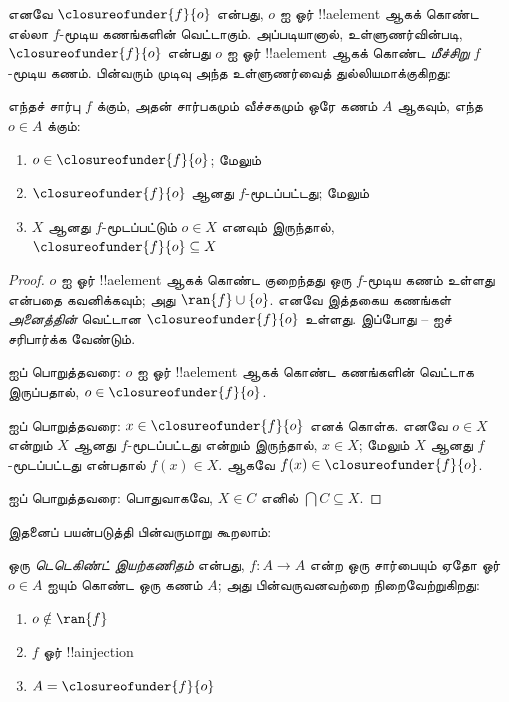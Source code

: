 \documentclass[../../../include/open-logic-section]{subfiles}
\begin{document}
எனவே $\closureofunder{f}{o}$ என்பது, $o$ ஐ ஓர் !!a{element} ஆகக்
கொண்ட எல்லா $f$-மூடிய கணங்களின் வெட்டாகும்.
அப்படியானால், உள்ளுணர்வின்படி, $\closureofunder{f}{o}$ என்பது
$o$ ஐ ஓர் !!a{element} ஆகக் கொண்ட \emph{மீச்சிறு} $f$-மூடிய கணம்.
பின்வரும் முடிவு அந்த உள்ளுணர்வைத் துல்லியமாக்குகிறது:
\begin{lem}
	எந்தச் சார்பு $f$ க்கும், அதன் சார்பகமும் வீச்சகமும் ஒரே கணம்
    $A$ ஆகவும், எந்த $o \in A$ க்கும்:
	\begin{enumerate}
		\item{} $o \in \closureofunder{f}{o}$; மேலும்
		\item{} $\closureofunder{f}{o}$ ஆனது $f$-மூடப்பட்டது; மேலும்
		\item{} $X$ ஆனது $f$-மூடப்பட்டும் $o \in
		X$ எனவும் இருந்தால், $\closureofunder{f}{o} \subseteq X$
	\end{enumerate}
\end{lem}

\begin{proof}
$o$ ஐ ஓர் !!a{element} ஆகக் கொண்ட குறைந்தது ஒரு $f$-மூடிய கணம்
உள்ளது என்பதை கவனிக்கவும்; அது $\ran{f}\cup \{o\}$.
எனவே இத்தகைய கணங்கள் \emph{அனைத்தின்} வெட்டான
$\closureofunder{f}{o}$ உள்ளது.
இப்போது -- ஐச்
சரிபார்க்க வேண்டும்.

 ஐப் பொறுத்தவரை:
$o$ ஐ ஓர் !!a{element} ஆகக் கொண்ட கணங்களின் வெட்டாக இருப்பதால்,
$o \in \closureofunder{f}{o}$.

 ஐப் பொறுத்தவரை:
$x \in \closureofunder{f}{o}$ எனக் கொள்க.
எனவே $o \in X$ என்றும் $X$ ஆனது $f$-மூடப்பட்டது என்றும் இருந்தால்,
$x \in X$; மேலும் $X$ ஆனது $f$-மூடப்பட்டது என்பதால் $f(x) \in X$.
ஆகவே $f(x) \in \closureofunder{f}{o}$.

 ஐப் பொறுத்தவரை:
பொதுவாகவே, $X \in C$ எனில் $\bigcap C \subseteq X$.
\end{proof}

இதனைப் பயன்படுத்தி பின்வருமாறு கூறலாம்:

\begin{defn}
ஒரு \emph{டெடெகிண்ட் இயற்கணிதம்} என்பது,
$f \colon A \to A$ என்ற ஒரு சார்பையும் ஏதோ ஓர் $o \in A$ ஐயும்
கொண்ட ஒரு கணம் $A$; அது பின்வருவனவற்றை நிறைவேற்றுகிறது:
	\begin{enumerate}
		\item {} $o \notin \ran{f}$
		\item {} $f$ ஓர் !!a{injection}
		\item {} $A = \closureofunder{f}{o}$
	\end{enumerate}
\end{defn}
\end{document}
